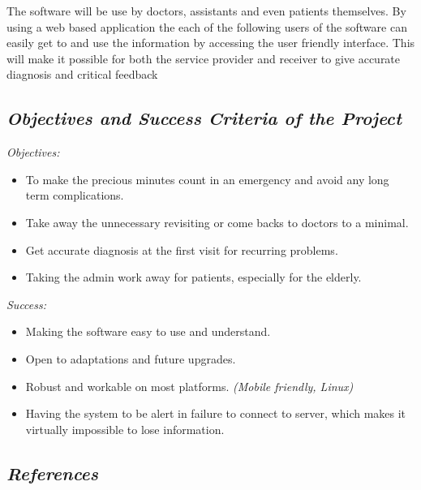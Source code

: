 \documentclass[a4paper]{article}
\begin{document}
The software will be use by doctors, assistants and even patients themselves. By using a web based application the each of the following users of the software can easily get to and use the information by accessing the user friendly interface. This will make it possible for both the service provider and receiver to give accurate diagnosis and critical feedback

\subsection{\textit{Objectives and Success Criteria of the Project}}

\emph{Objectives:}

\begin{itemize} 

\item To make the precious minutes count in an emergency and avoid any long term complications.

\item Take away the unnecessary revisiting or come backs to doctors to a minimal.

\item Get accurate diagnosis at the first visit for recurring problems.

\item Taking the admin work away for patients, especially for the elderly.

\end{itemize}

\emph{Success:}

\begin{itemize} 

\item Making the software easy to use and understand.

\item Open to adaptations and future upgrades.

\item Robust and workable on most platforms. \emph{(Mobile friendly, Linux)}

\item Having the system to be alert in failure to connect to server, which makes it virtually impossible to lose information. 

\end{itemize}
		
\subsection{\textit{References}}
\end{document}
